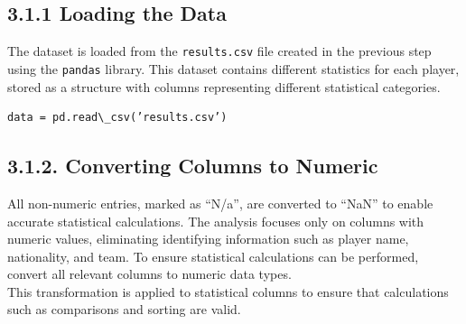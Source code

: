 \documentclass[a4paper,12pt]{article}
\begin{document}
\subsection*{\textbf{3.1.1 Loading the Data}}
\vspace{-10pt}
The dataset is loaded from the \texttt{results.csv} file created in the previous step using the \texttt{pandas} library. This dataset contains different statistics for each player, stored as a structure with columns representing different statistical categories.

\begin{mdframed}
\begin{verbatim}
data = pd.read\_csv(’results.csv’)
\end{verbatim}
\end{mdframed}

\subsection*{\textbf{3.1.2. Converting Columns to Numeric}}
All non-numeric entries, marked as “N/a”, are converted to “NaN” to enable accurate statistical calculations. The analysis focuses only on columns with numeric values, eliminating identifying information such as player name, nationality, and team. To ensure statistical calculations can be performed, convert all relevant columns to numeric data types.\\
This transformation is applied to statistical columns to ensure that calculations such as comparisons and sorting are valid.
\end{document}

